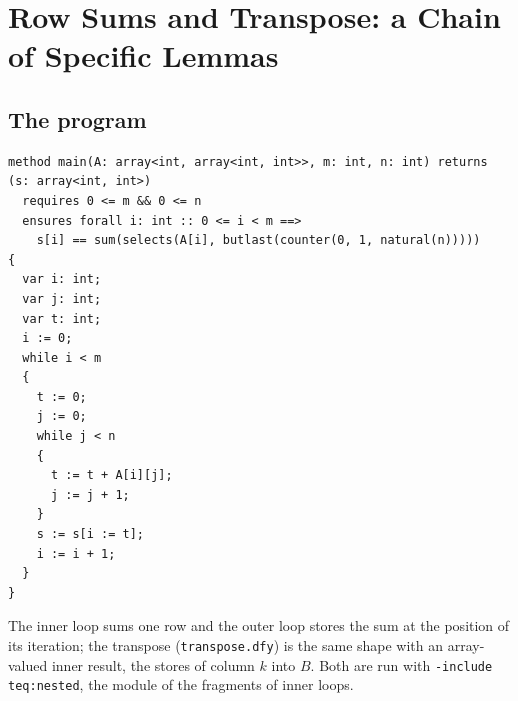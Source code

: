 \section{Row Sums and Transpose: a Chain of Specific Lemmas}\label{sec:rows}

\subsection{The program}
\begin{lstlisting}
method main(A: array<int, array<int, int>>, m: int, n: int) returns (s: array<int, int>)
  requires 0 <= m && 0 <= n
  ensures forall i: int :: 0 <= i < m ==>
    s[i] == sum(selects(A[i], butlast(counter(0, 1, natural(n)))))
{
  var i: int;
  var j: int;
  var t: int;
  i := 0;
  while i < m
  {
    t := 0;
    j := 0;
    while j < n
    {
      t := t + A[i][j];
      j := j + 1;
    }
    s := s[i := t];
    i := i + 1;
  }
}
\end{lstlisting}
The inner loop sums one row and the outer loop stores the sum at the position of its iteration; the
transpose (\texttt{transpose.dfy}) is the same shape with an array-valued inner result, the stores of
column $k$ into $B$. Both are run with \texttt{-include teq:nested}, the module of the fragments of inner loops.

